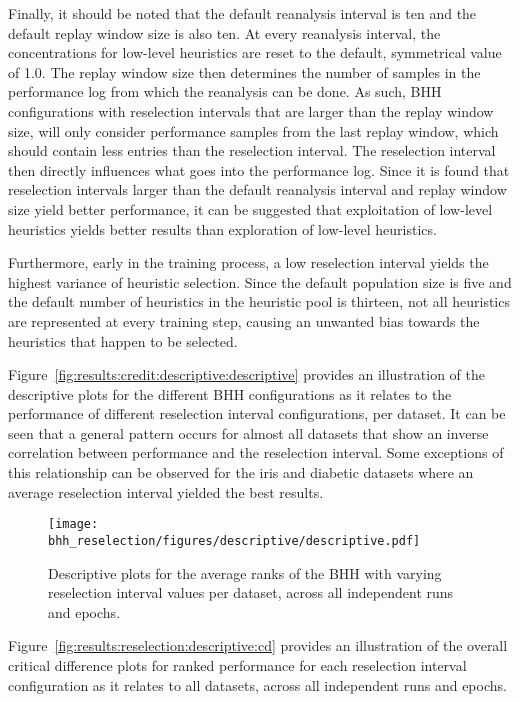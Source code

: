 Finally, it should be noted that the default reanalysis interval is ten and the default replay window size is also ten. At every reanalysis interval, the concentrations for low-level heuristics are reset to the default, symmetrical value of 1.0. The replay window size then determines the number of samples in the performance log from which the reanalysis can be done. As such, \acs{BHH} configurations with reselection intervals that are larger than the replay window size, will only consider performance samples from the last replay window, which should contain less entries than the reselection interval. The reselection interval then directly influences what goes into the performance log. Since it is found that reselection intervals larger than the default reanalysis interval and replay window size yield better performance, it can be suggested that exploitation of low-level heuristics yields better results than exploration of low-level heuristics.

Furthermore, early in the training process, a low reselection interval yields the highest variance of heuristic selection. Since the default population size is five and the default number of heuristics in the heuristic pool is thirteen, not all heuristics are represented at every training step, causing an unwanted bias towards the heuristics that happen to be             selected.

Figure~\ref{fig:results:credit:descriptive:descriptive} provides an illustration of the descriptive plots for the different \acs{BHH} configurations as it relates to the performance of different reselection interval configurations, per dataset. It can be seen that a general pattern occurs for almost all datasets that show an inverse correlation between performance and the reselection interval. Some exceptions of this relationship can be observed for the iris and diabetic datasets where an average reselection interval yielded the best results.

\begin{figure}[htb]
	\centering
	\texttt{[image: bhh\_reselection/figures/descriptive/descriptive.pdf]}
	\caption{Descriptive plots for the average ranks of the \acs{BHH} with varying reselection interval values per dataset, across all independent runs and epochs.}
	\label{fig:results:reselection:descriptive:descriptive}
\end{figure}

Figure~\ref{fig:results:reselection:descriptive:cd} provides an illustration of the overall critical difference plots for ranked performance for each reselection interval configuration as it relates to all datasets, across all independent runs and epochs.

